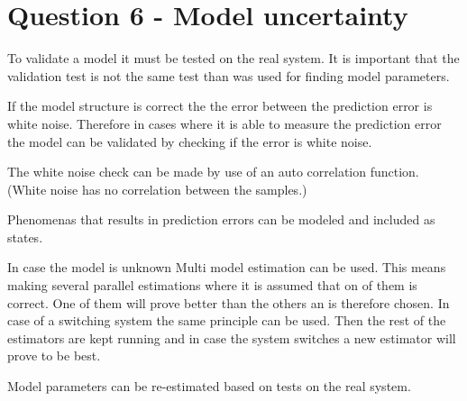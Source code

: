 \chapter{Question 6 - Model uncertainty}

To validate a model it must be tested on the real system. It is important that the validation test is not the same test than was used for finding model parameters. 

If the model structure is correct the the error between the prediction error is white noise. Therefore in cases where it is able to measure the prediction error the model can be validated by checking if the error is white noise. 

The white noise check can be made by use of an auto correlation function. (White noise has no correlation between the samples.)


Phenomenas that results in prediction errors can be modeled and included as states. 

In case the model is unknown Multi model estimation can be used. This means making several parallel estimations where it is assumed that on of them is correct. One of them will prove better than the others an is therefore chosen. In case of a switching system the same principle can be used. Then the rest of the estimators are kept running and in case the system switches a new estimator will prove to be best. 

Model parameters can be re-estimated based on tests on the real system.